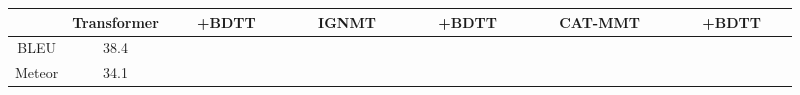 

\begin{table}[!htbp]
    \label{tab:5_product_data}
    \centering
    \footnotesize%
    \setlength{\tabcolsep}{4pt}%
    \renewcommand{\arraystretch}{1.2}%
    \begin{tabular}{c|cc|cc|cc}
    \hline
           & Transformer & ~~~+BDTT~~~ & ~~~IGNMT~~~ & ~~~+BDTT~~~ & ~~~CAT-MMT~~~ & ~~~+BDTT~~~ \\\hline
    BLEU   & 38.4 & & & & & \\
    Meteor & 34.1 & & & & & \\ 
    \hline
    \end{tabular}%
\end{table}%